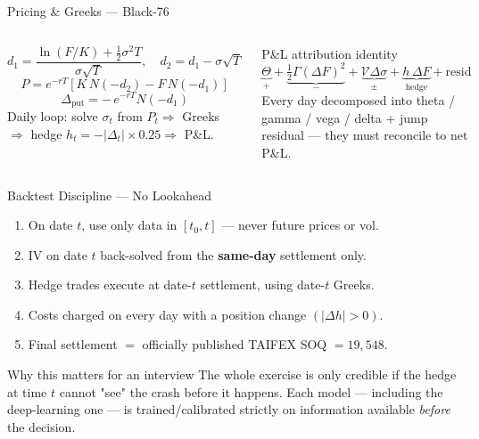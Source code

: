\documentclass[aspectratio=169,t]{beamer}
\begin{document}
\begin{frame}{Pricing \& Greeks --- Black-76}
  \begin{columns}[T]
      \[ d_1=\frac{\ln(F/K)+\tfrac12\sigma^2 T}{\sigma\sqrt T},\quad d_2=d_1-\sigma\sqrt T \]
      \[ P = e^{-rT}\!\left[K\,N(-d_2)-F\,N(-d_1)\right] \]
      \[ \Delta_{\text{put}} = -\,e^{-rT}N(-d_1) \]
      \vspace{0.2em}
      {\small Daily loop: solve $\sigma_t$ from $P_t \Rightarrow$ Greeks $\Rightarrow$ hedge $h_t=-|\Delta_t|\times0.25 \Rightarrow$ P\&L.}
      \begin{block}{P\&L attribution identity}
        \small
        \[
        \underbrace{\Theta}_{+}+\underbrace{\tfrac12\Gamma(\Delta F)^2}_{-}+\underbrace{\mathcal{V}\Delta\sigma}_{\pm}+\underbrace{h\,\Delta F}_{\text{hedge}}+\text{resid}
        \]
        Every day decomposed into theta / gamma / vega / delta + jump residual --- they must reconcile to net P\&L.
      \end{block}
  \end{columns}
\end{frame}

\begin{frame}{Backtest Discipline --- No Lookahead}
  \begin{enumerate}
    \item On date $t$, use only data in $[t_0,t]$ --- never future prices or vol.
    \item IV on date $t$ back-solved from the \textbf{same-day} settlement only.
    \item Hedge trades execute at date-$t$ settlement, using date-$t$ Greeks.
    \item Costs charged on every day with a position change $(|\Delta h|>0)$.
    \item Final settlement $=$ officially published TAIFEX SOQ $=19{,}548$.
  \end{enumerate}
  \vspace{0.4em}
  \begin{exampleblock}{Why this matters for an interview}
    The whole exercise is only credible if the hedge at time $t$ cannot "see" the crash before it happens. Each model --- including the deep-learning one --- is trained/calibrated strictly on information available \emph{before} the decision.
  \end{exampleblock}
\end{frame}

\end{document}
